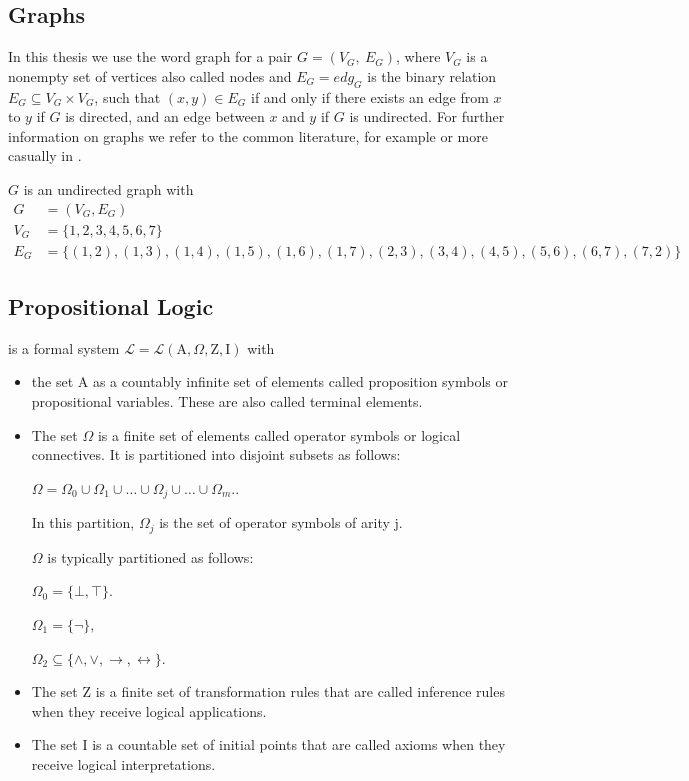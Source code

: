 \documentclass[a4paper, 12pt, bibliography=totoc]{scrartcl}
\begin{document}
\subsection{Graphs}

In this thesis we use the word {graph} for a pair $G=(V_{G},~E_{G})$, where $V_{G}$ is a nonempty set of vertices also called {nodes} and $E_{G}=edg_{G} $ is the binary relation $E_{G} \subseteq V_{G} \times V_{G}$, such that $(x,y)\in E_{G}$ if and only if there exists an edge from $x$ to $y$ if $G$ is directed, and an edge between $x$ and $y$ if $G$ is undirected. For further information on graphs we refer to the common literature, for example \cite[p. {401--412}]{HandbookMathGraph} or more casually in \cite{britannicagraphs}. 

\begin{example}\label{ex:wheelgraph}
	$G$ is an undirected graph with
	\begin{align*}
	 G&=(V_{G},E_{G})\\
	 	 V_{G} &= \{1,2,3,4,5,6,7\}\\
	   E_{G} &= \{(1,2),(1,3), (1,4), (1,5),(1,6), (1,7), (2,3), (3,4), (4,5), (5,6), (6,7), (7,2)\}
	\end{align*}
\end{example}


\subsection{Propositional Logic}
 is a formal system $\mathcal{L} = \mathcal{L}(\mathrm {A},\Omega, \mathrm{Z}, \mathrm{I})$ with
\begin{itemize}
	\item the set $\mathrm {A}$ as a countably infinite set of elements called proposition symbols or propositional variables. These are also called terminal elements.
	\item The set $\Omega$ is a finite set of elements called operator symbols or logical connectives. It is partitioned into disjoint subsets as follows:
	
	$\Omega =\Omega _{0}\cup \Omega _{1}\cup \ldots \cup \Omega _{j}\cup \ldots \cup \Omega _{m}.$.
	
	In this partition, $\Omega _{j}$ is the set of operator symbols of arity j.
	
	$\Omega$ is typically partitioned as follows:
	
	${ \Omega _{0}=\{\bot ,\top \}.}$ 
	
	${\Omega _{1}=\{\lnot \},}$
	
	${ \Omega _{2}\subseteq \{\land ,\lor ,\to ,\leftrightarrow \}.}$

	\item The set $\mathrm {Z}$ is a finite set of transformation rules that are called inference rules when they receive logical applications.
	
	\item The set $\mathrm {I}$ is a countable set of initial points that are called axioms when they receive logical interpretations.
\end{itemize}
\end{document}
